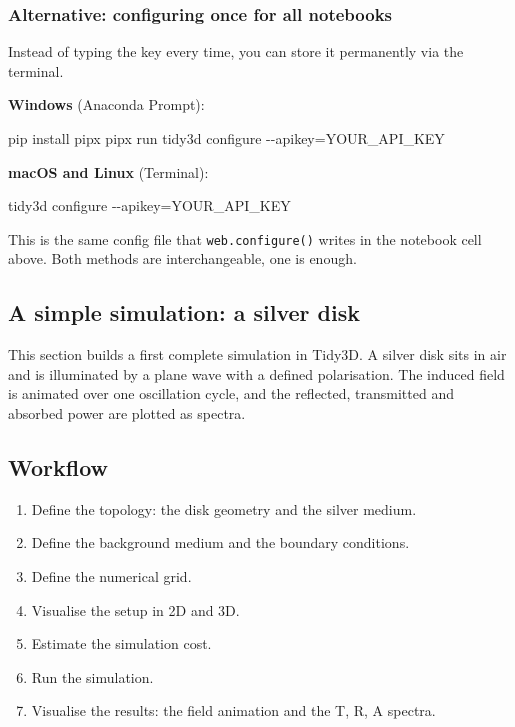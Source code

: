 \documentclass[11pt]{article}
\providecommand{\tightlist}{%
      \setlength{\itemsep}{0pt}\setlength{\parskip}{0pt}}
\newenvironment{Shaded}{}{}
\newcommand{\NormalTok}[1]{{#1}}
\newcommand{\OperatorTok}[1]{\textcolor[rgb]{0.40,0.40,0.40}{{#1}}}
\newcommand{\ExtensionTok}[1]{{#1}}
\newcommand{\AttributeTok}[1]{\textcolor[rgb]{0.49,0.56,0.16}{{#1}}}
\begin{document}
    
    \subsubsection{Alternative: configuring once for all
notebooks}\label{alternative-configuring-once-for-all-notebooks}

Instead of typing the key every time, you can store it permanently via
the terminal.

\textbf{Windows} (Anaconda Prompt):

\begin{Shaded}
\begin{Highlighting}[]
\ExtensionTok{pip}\NormalTok{ install pipx}
\ExtensionTok{pipx}\NormalTok{ run tidy3d configure }\AttributeTok{{-}{-}apikey}\OperatorTok{=}\NormalTok{YOUR\_API\_KEY}
\end{Highlighting}
\end{Shaded}

\textbf{macOS and Linux} (Terminal):

\begin{Shaded}
\begin{Highlighting}[]
\ExtensionTok{tidy3d}\NormalTok{ configure }\AttributeTok{{-}{-}apikey}\OperatorTok{=}\NormalTok{YOUR\_API\_KEY}
\end{Highlighting}
\end{Shaded}

This is the same config file that \texttt{web.configure()} writes in the
notebook cell above. Both methods are interchangeable, one is enough.

    \subsection{A simple simulation: a silver
disk}\label{a-simple-simulation-a-silver-disk}

This section builds a first complete simulation in Tidy3D. A silver disk
sits in air and is illuminated by a plane wave with a defined
polarisation. The induced field is animated over one oscillation cycle,
and the reflected, transmitted and absorbed power are plotted as
spectra.

    \subsection{Workflow}\label{workflow}

\begin{enumerate}
\def\labelenumi{\arabic{enumi}.}
\tightlist
\item
  Define the topology: the disk geometry and the silver medium.
\item
  Define the background medium and the boundary conditions.
\item
  Define the numerical grid.
\item
  Visualise the setup in 2D and 3D.
\item
  Estimate the simulation cost.
\item
  Run the simulation.
\item
  Visualise the results: the field animation and the T, R, A spectra.
\end{enumerate}
\end{document}
